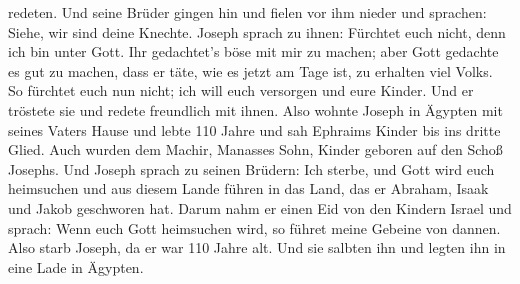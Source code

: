 redeten.  Und seine Brüder gingen hin und fielen vor ihm
nieder und sprachen: Siehe, wir sind deine Knechte. 
Joseph sprach zu ihnen: Fürchtet euch nicht, denn ich bin unter Gott.
 Ihr gedachtet's böse mit mir zu machen; aber Gott
gedachte es gut zu machen, dass er täte, wie es jetzt am Tage ist, zu
erhalten viel Volks.  So fürchtet euch nun nicht; ich
will euch versorgen und eure Kinder. Und er tröstete sie und redete
freundlich mit ihnen.  Also wohnte Joseph in Ägypten mit
seines Vaters Hause und lebte 110 Jahre  und sah Ephraims
Kinder bis ins dritte Glied. Auch wurden dem Machir, Manasses Sohn,
Kinder geboren auf den Schoß Josephs.  Und Joseph sprach
zu seinen Brüdern: Ich sterbe, und Gott wird euch heimsuchen und aus
diesem Lande führen in das Land, das er Abraham, Isaak und Jakob
geschworen hat.  Darum nahm er einen Eid von den Kindern
Israel und sprach: Wenn euch Gott heimsuchen wird, so führet meine
Gebeine von dannen.  Also starb Joseph, da er war 110
Jahre alt. Und sie salbten ihn und legten ihn in eine Lade in Ägypten.
